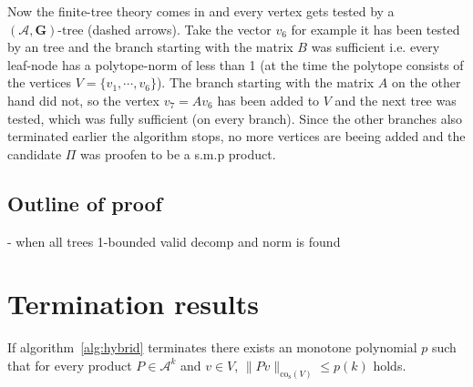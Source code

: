 Now the finite-tree theory comes in and every vertex gets tested by a $(\mathcal{A},\mathbf{G})\text{-tree}$ (dashed arrows). Take the vector $v_6$ for example it has been tested by an tree and the branch starting with the matrix $B$ was sufficient i.e. every leaf-node has a polytope-norm of less than 1 (at the time the polytope consists of the vertices $V = \{v_1, \cdots, v_6\}$). The branch starting with the matrix $A$ on the other hand did not, so the vertex $v_7 = Av_6$ has been added to $V$ and the next tree was tested, which was fully sufficient (on every branch). Since the other branches also terminated earlier the algorithm stops, no more vertices are beeing added and the candidate $\Pi$ was proofen to be a s.m.p product. 

\subsection{Outline of proof}
- when all trees 1-bounded valid decomp and norm is found 

\section{Termination results}

\begin{lemma}
  \label{lem:arb.prod.bound}
  If algorithm~\ref{alg:hybrid} terminates there exists an monotone polynomial $p$ such that for every product $P \in \mathcal{A}^k$ and $v \in V$, $\lVert Pv \rVert _{\text{co}_{\text{s}}(V)} \le p(k)$ holds.
\end{lemma}

